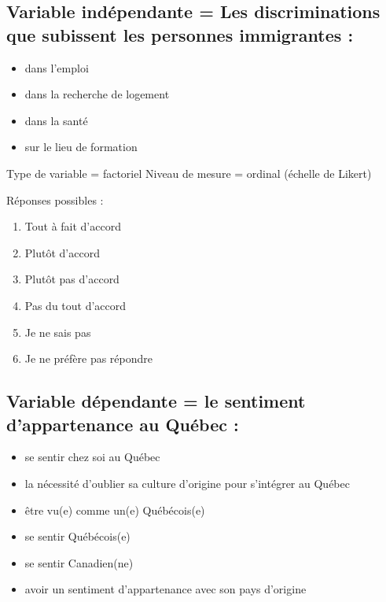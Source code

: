 \documentclass[
]{article}
\providecommand{\tightlist}{%
  \setlength{\itemsep}{0pt}\setlength{\parskip}{0pt}}
\begin{document}
\hypertarget{variable-induxe9pendante-les-discriminations-que-subissent-les-personnes-immigrantes}{%
\subsection{Variable indépendante = Les discriminations que subissent
les personnes immigrantes
:}\label{variable-induxe9pendante-les-discriminations-que-subissent-les-personnes-immigrantes}}

\begin{itemize}
\tightlist
\item
  dans l'emploi
\item
  dans la recherche de logement
\item
  dans la santé
\item
  sur le lieu de formation
\end{itemize}

Type de variable = factoriel Niveau de mesure = ordinal (échelle de
Likert)

Réponses possibles :

\begin{enumerate}
\def\labelenumi{\arabic{enumi}.}
\tightlist
\item
  Tout à fait d'accord
\item
  Plutôt d'accord
\item
  Plutôt pas d'accord
\item
  Pas du tout d'accord
\item
  Je ne sais pas
\item
  Je ne préfère pas répondre
\end{enumerate}

\hypertarget{variable-duxe9pendante-le-sentiment-dappartenance-au-quuxe9bec}{%
\subsection{Variable dépendante = le sentiment d'appartenance au Québec
:}\label{variable-duxe9pendante-le-sentiment-dappartenance-au-quuxe9bec}}

\begin{itemize}
\tightlist
\item
  se sentir chez soi au Québec
\item
  la nécessité d'oublier sa culture d'origine pour s'intégrer au Québec
\item
  être vu(e) comme un(e) Québécois(e)
\item
  se sentir Québécois(e)
\item
  se sentir Canadien(ne)
\item
  avoir un sentiment d'appartenance avec son pays d'origine
\end{itemize}
\end{document}
